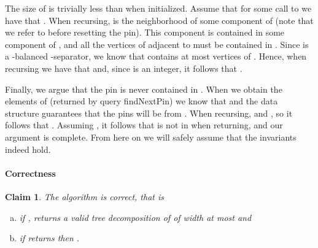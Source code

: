 \documentclass[a4paper,11pt]{article}
\newtheorem{claim}[lemma]{Claim}
\theoremstyle{definition}
\theoremstyle{remark}
\newcommand{\qpin}{\textnormal{findNextPin}}
\begin{document}
The size of  is trivially less than  when initialized.
Assume that for some call to  we have that .  When recursing,  is the neighborhood of some component 
of  (note that we refer to
 before resetting the pin).  This component is contained in some
component  of , and all the
vertices of  adjacent to  must be contained in .  Since
 is a -balanced -separator, we know that
 contains at most  vertices of .
Hence, when recursing we have that  and, since  is
an integer, it follows that .

Finally, we argue that the pin  is never contained in .  When
we obtain the elements of  (returned by query \qpin) we know
that  and the data structure guarantees that the pins will
be from .  When recursing,
 and , so it follows
that .  Assuming , it follows that
 is not in  when returning, and our argument is complete.
From here on we will safely assume that the invariants indeed hold.

\paragraph{Correctness}
\begin{claim}
  \label{claim:findtd-nlogn-correct}
  The algorithm  is correct, that is
  \begin{enumerate}[(a)]
  \item\label{item:1:claim:findtd-nlogn-correct} if ,
     returns a valid tree decomposition of  of
    width at most  and
  \item\label{item:2:claim:findtd-nlogn-correct} if  returns
     then .
  \end{enumerate}
\end{claim}
\end{document}
